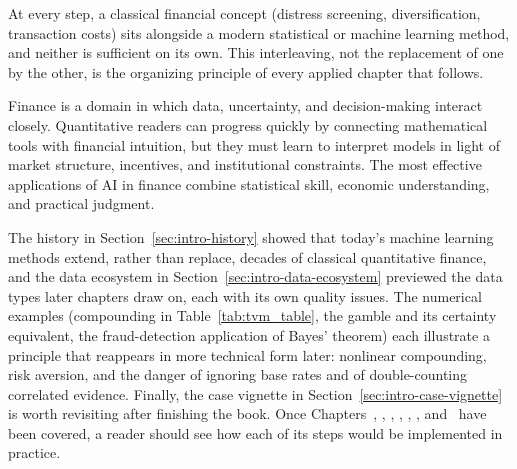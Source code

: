 \documentclass[../ai_in_finance]{subfiles}
\begin{document}
At every step, a classical financial concept (distress screening, diversification, transaction costs) sits alongside a modern statistical or machine learning method, and neither is sufficient on its own. This interleaving, not the replacement of one by the other, is the organizing principle of every applied chapter that follows.


Finance is a domain in which data, uncertainty, and decision-making interact closely. Quantitative readers can progress quickly by connecting mathematical tools with financial intuition, but they must learn to interpret models in light of market structure, incentives, and institutional constraints. The most effective applications of AI in finance combine statistical skill, economic understanding, and practical judgment.

The history in Section~\ref{sec:intro-history} showed that today's machine learning methods extend, rather than replace, decades of classical quantitative finance, and the data ecosystem in Section~\ref{sec:intro-data-ecosystem} previewed the data types later chapters draw on, each with its own quality issues.
The numerical examples (compounding in Table~\ref{tab:tvm_table}, the gamble and its certainty equivalent, the fraud-detection application of Bayes' theorem) each illustrate a principle that reappears in more technical form later: nonlinear compounding, risk aversion, and the danger of ignoring base rates and of double-counting correlated evidence.
Finally, the case vignette in Section~\ref{sec:intro-case-vignette} is worth revisiting after finishing the book. Once Chapters~, , , , , , and~ have been covered, a reader should see how each of its steps would be implemented in practice.

\end{document}
